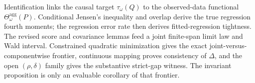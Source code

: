 Identification links the causal target \(\tau_\omega(Q)\) to the observed-data functional \(\Theta_\omega^{\mathrm{agg}}(P)\). Conditional Jensen's inequality and overlap derive the true regression fourth moments; the regression error rate then derives fitted-regression tightness. The revised score and covariance lemmas feed a joint finite-span limit law and Wald interval. Constrained quadratic minimization gives the exact joint-versus-componentwise frontier, continuous mapping proves consistency of \(\widehat\Delta\), and the open \((\rho,\delta)\) family gives the substantive strict-gap witness. The invariant proposition is only an evaluable corollary of that frontier.
